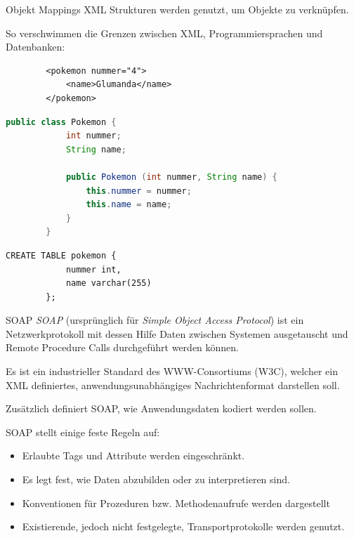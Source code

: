 \begin{bonus}{Objekt Mappings}
    XML Strukturen werden genutzt, um Objekte zu verknüpfen.

    So verschwimmen die Grenzen zwischen XML, Programmiersprachen und Datenbanken:

    \begin{lstlisting}
        <pokemon nummer="4">
            <name>Glumanda</name>
        </pokemon>
    \end{lstlisting}

    \begin{lstlisting}[language=java]
        public class Pokemon {
            int nummer;
            String name;

            public Pokemon (int nummer, String name) {
                this.nummer = nummer;
                this.name = name;
            }
        }
    \end{lstlisting}

    \begin{lstlisting}[language=mysql]
        CREATE TABLE pokemon {
            nummer int,
            name varchar(255)
        };
    \end{lstlisting}
\end{bonus}

\begin{defi}{SOAP}
    \emph{SOAP} (ursprünglich für \emph{Simple Object Access Protocol}) ist ein Netzwerkprotokoll mit dessen Hilfe Daten zwischen Systemen ausgetauscht und Remote Procedure Calls durchgeführt werden können.

    Es ist ein industrieller Standard des WWW-Consortiums (W3C), welcher ein XML definiertes, anwendungsunabhängiges Nachrichtenformat darstellen soll.

    Zusätzlich definiert SOAP, wie Anwendungsdaten kodiert werden sollen.

    SOAP stellt einige feste Regeln auf:
    \begin{itemize}
        \item Erlaubte Tags und Attribute werden eingeschränkt.
        \item Es legt fest, wie Daten abzubilden oder zu interpretieren sind.
        \item Konventionen für Prozeduren bzw. Methodenaufrufe werden dargestellt
        \item Existierende, jedoch nicht festgelegte, Transportprotokolle werden genutzt.
    \end{itemize}
\end{defi}

